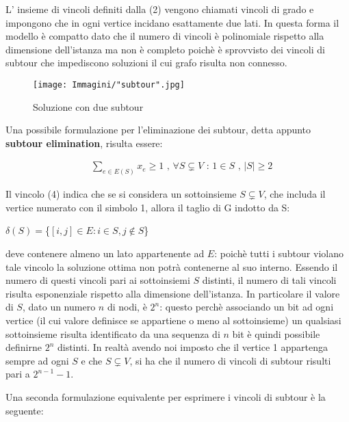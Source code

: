 \documentclass[11pt]{article}
\begin{document}
L' insieme di vincoli definiti dalla (2) vengono chiamati vincoli di grado e impongono che in ogni vertice incidano esattamente due lati. In questa forma il modello è  compatto dato che il numero di vincoli è polinomiale rispetto alla dimensione dell'istanza ma non è completo poichè è sprovvisto dei vincoli di subtour che impediscono soluzioni il cui grafo risulta non connesso.


\begin{figure}[htbp]
    \centering
    \texttt{[image: Immagini/"subtour".jpg]}
    \caption{Soluzione con due subtour}
\end{figure}

\vspace{2\baselineskip}

Una possibile formulazione per l'eliminazione dei subtour, detta appunto \textbf{subtour elimination}, risulta essere:

\begin{eqnarray}
&\displaystyle{\sum_{e \in E(S)}x_e \geq 1} \text{ , } \forall S \subsetneq V \text{ : } 1 \in S \text{ , } |S| \geq 2
\end{eqnarray}


Il vincolo (4) indica che se si considera un sottoinsieme $S \subsetneq V$, che includa il vertice numerato con il simbolo 1, allora il taglio di G indotto da S:

\begin{center}
$\delta(S) = $\{$ {[i,j]\in E : i \in S, j \notin S} $\} $ $
\end{center}

deve contenere almeno un lato appartenente ad $E$: poichè tutti i subtour violano tale vincolo la soluzione ottima non potrà contenerne al suo interno.  
Essendo il numero di questi vincoli pari ai sottoinsiemi $S$ distinti, il numero di tali vincoli risulta esponenziale rispetto alla dimensione dell'istanza. In particolare il valore di $S$, dato un numero $n$ di nodi, è $2^n$: questo perchè associando un bit ad ogni vertice (il cui valore definisce se appartiene o meno al sottoinsieme) un qualsiasi sottoinsieme risulta identificato da una sequenza di $n$ bit è quindi possibile definirne $2^n$ distinti. In realtà avendo noi imposto che il vertice 1 appartenga sempre ad ogni $S$ e che $S \subsetneq V$, si ha che il numero di vincoli di subtour risulti pari a  $2^{n-1} - 1$.

Una seconda formulazione equivalente per esprimere i vincoli di subtour è la seguente:
\end{document}
